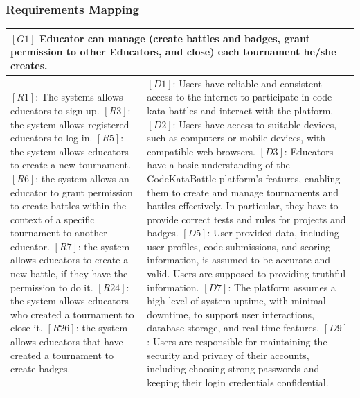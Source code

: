 \newpage

\subsubsection{Requirements Mapping}

\vspace{1cm}

\begin{table}[H]
    \centering
    \begin{tabular}{|p{8cm}|p{8cm}|}
      \hline
      \multicolumn{2}{|p{16cm}|}{\textbf{$[G1]$ Educator can manage (create battles and badges, grant permission to other Educators, and close) each tournament he/she creates. }} \\
      \hline
      {$[R1]$: The systems allows educators to sign up.
      \newline$[R3]$: the system allows registered educators to log in.
      \newline$[R5]$: the system allows educators to create a new tournament.
      \newline$[R6]$: the system allows an educator to grant permission to create battles within the context of a specific tournament to another educator.
      \newline$[R7]$: the system allows educators to create a new battle, if they have the permission to do it.
      \newline$[R24]$: the system allows educators who created a tournament to close it.
      \newline$[R26]$: the system allows educators that have created a tournament to create badges.}
      & 
      {$[D1]$: Users have reliable and consistent access to the internet to participate in code kata battles and interact with the platform.
      \newline$[D2]$: Users have access to suitable devices, such as computers or mobile devices, with compatible web browsers.
      \newline$[D3]$: Educators have a basic understanding of the CodeKataBattle platform's features, enabling them to create and manage tournaments and battles effectively. In particular, they have to provide correct tests and rules for projects and badges.
      \newline$[D5]$: User-provided data, including user profiles, code submissions, and scoring information, is assumed to be accurate and valid. Users are supposed to providing truthful information.
      \newline$[D7]$: The platform assumes a high level of system uptime, with minimal downtime, to support user interactions, database storage, and real-time features.
      \newline$[D9]$: Users are responsible for maintaining the security and privacy of their accounts, including choosing strong passwords and keeping their login credentials confidential.}
      \\
      \hline
    \end{tabular}
\end{table}

